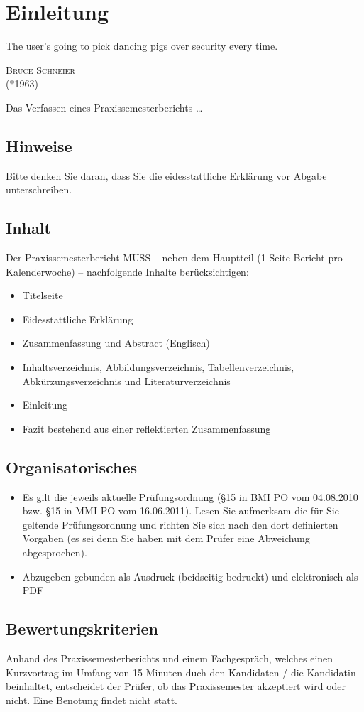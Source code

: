 \chapter{Einleitung}

\epigraph{\glqq The user's going to pick dancing pigs over security every time.\grqq\bigskip}
{\textsc{Bruce Schneier}\\ ($\ast$1963)}

\noindent
Das Verfassen eines Praxissemesterberichts \dots
\indent

\section{Hinweise}

Bitte denken Sie daran, dass Sie die eidesstattliche Erklärung vor Abgabe unterschreiben.

\section{Inhalt}

Der Praxissemesterbericht MUSS -- neben dem Hauptteil (1 Seite Bericht pro Kalenderwoche) --
nachfolgende Inhalte berücksichtigen:

\begin{itemize}
  \item Titelseite
  \item Eidesstattliche Erklärung
  \item Zusammenfassung und Abstract (Englisch)
  \item Inhaltsverzeichnis, Abbildungsverzeichnis, Tabellenverzeichnis, Abkürzungs\-ver\-zeichnis und Literaturverzeichnis
  \item Einleitung
  \item Fazit bestehend aus einer reflektierten Zusammenfassung
\end{itemize}

\section{Organisatorisches}

\begin{itemize}
 \item Es gilt die jeweils aktuelle Pr\"ufungsordnung (\S 15 in BMI PO vom 04.08.2010 bzw. \S 15 in MMI PO vom 16.06.2011).
 Lesen Sie aufmerksam die für Sie geltende Prüfungsordnung und richten Sie sich nach den dort
 definierten Vorgaben (es sei denn Sie haben mit dem Prüfer eine Abweichung abgesprochen).
 \item Abzugeben gebunden als Ausdruck (beidseitig bedruckt) und elektronisch als PDF
\end{itemize}

\section{Bewertungskriterien}

Anhand des Praxissemesterberichts und einem Fachgespräch, welches einen Kurzvortrag im Umfang von 15 Minuten
duch den Kandidaten / die Kandidatin beinhaltet, entscheidet der Prüfer, ob das Praxissemester akzeptiert
wird oder nicht. Eine Benotung findet nicht statt.